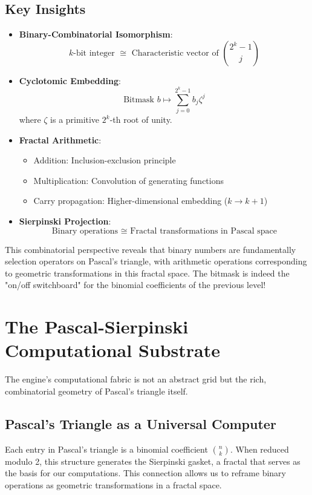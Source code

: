\subsection{Key Insights}
\begin{itemize}
    \item \textbf{Binary-Combinatorial Isomorphism}: 
   $$k\text{-bit integer } \cong \text{ Characteristic vector of } \binom{2^k-1}{j}$$
    \item \textbf{Cyclotomic Embedding}:
   $$\text{Bitmask } b \mapsto \sum_{j=0}^{2^k-1} b_j \zeta^{j}$$
   where $\zeta$ is a primitive $2^k$-th root of unity.
    \item \textbf{Fractal Arithmetic}:
    \begin{itemize}
        \item Addition: Inclusion-exclusion principle
        \item Multiplication: Convolution of generating functions
        \item Carry propagation: Higher-dimensional embedding ($k \rightarrow k+1$)
    \end{itemize}
    \item \textbf{Sierpinski Projection}:
   $$\text{Binary operations } \cong \text{ Fractal transformations in Pascal space}$$
\end{itemize}

This combinatorial perspective reveals that binary numbers are fundamentally selection operators on Pascal's triangle, with arithmetic operations corresponding to geometric transformations in this fractal space. The bitmask is indeed the "on/off switchboard" for the binomial coefficients of the previous level!

\section{The Pascal-Sierpinski Computational Substrate}

The engine's computational fabric is not an abstract grid but the rich, combinatorial geometry of Pascal's triangle itself.

\subsection{Pascal's Triangle as a Universal Computer}
Each entry in Pascal's triangle is a binomial coefficient $\binom{n}{k}$. When reduced modulo 2, this structure generates the Sierpinski gasket, a fractal that serves as the basis for our computations. This connection allows us to reframe binary operations as geometric transformations in a fractal space.

